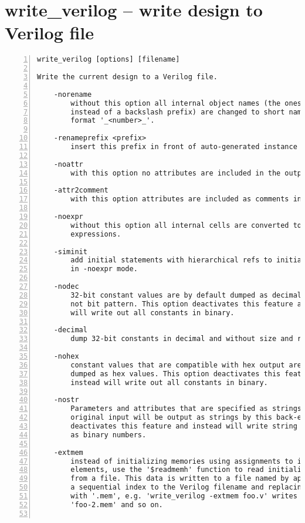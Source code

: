 \section{write\_verilog -- write design to Verilog file}
\label{cmd:write_verilog}
\begin{lstlisting}[numbers=left,frame=single]
    write_verilog [options] [filename]

Write the current design to a Verilog file.

    -norename
        without this option all internal object names (the ones with a dollar
        instead of a backslash prefix) are changed to short names in the
        format '_<number>_'.

    -renameprefix <prefix>
        insert this prefix in front of auto-generated instance names

    -noattr
        with this option no attributes are included in the output

    -attr2comment
        with this option attributes are included as comments in the output

    -noexpr
        without this option all internal cells are converted to Verilog
        expressions.

    -siminit
        add initial statements with hierarchical refs to initialize FFs when
        in -noexpr mode.

    -nodec
        32-bit constant values are by default dumped as decimal numbers,
        not bit pattern. This option deactivates this feature and instead
        will write out all constants in binary.

    -decimal
        dump 32-bit constants in decimal and without size and radix

    -nohex
        constant values that are compatible with hex output are usually
        dumped as hex values. This option deactivates this feature and
        instead will write out all constants in binary.

    -nostr
        Parameters and attributes that are specified as strings in the
        original input will be output as strings by this back-end. This
        deactivates this feature and instead will write string constants
        as binary numbers.

    -extmem
        instead of initializing memories using assignments to individual
        elements, use the '$readmemh' function to read initialization data
        from a file. This data is written to a file named by appending
        a sequential index to the Verilog filename and replacing the extension
        with '.mem', e.g. 'write_verilog -extmem foo.v' writes 'foo-1.mem',
        'foo-2.mem' and so on.


\end{lstlisting}
